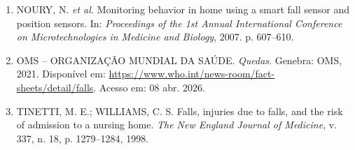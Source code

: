 \documentclass[a4paper,12pt]{article}
\begin{document}
\begin{enumerate}[leftmargin=0cm, labelindent=0cm, label={}]
    \item NOURY, N. \textit{et al.} Monitoring behavior in home using a smart fall sensor and position sensors. In: \textit{Proceedings of the 1st Annual International Conference on Microtechnologies in Medicine and Biology}, 2007. p. 607--610.

    \item OMS -- ORGANIZAÇÃO MUNDIAL DA SAÚDE. \textit{Quedas}. Genebra: OMS, 2021. Disponível em: \url{https://www.who.int/news-room/fact-sheets/detail/falls}. Acesso em: 08 abr. 2026.

    \item TINETTI, M. E.; WILLIAMS, C. S. Falls, injuries due to falls, and the risk of admission to a nursing home. \textit{The New England Journal of Medicine}, v. 337, n. 18, p. 1279--1284, 1998.
\end{enumerate}
\end{document}
